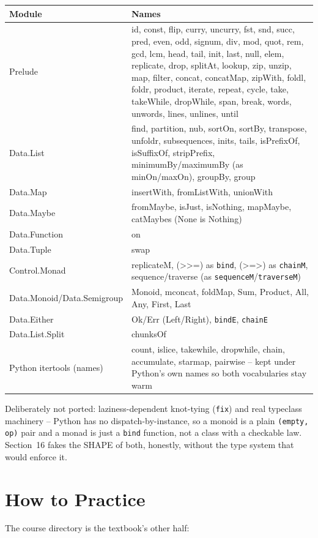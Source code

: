 \documentclass[11pt,letterpaper]{book}
\begin{document}
\begin{center}\small
\begin{tabular}{@{}p{}p{}@{}}
\toprule
\textbf{Module} & \textbf{Names} \\
\midrule
Prelude &
id, const, flip, curry, uncurry, fst, snd, succ, pred, even, odd, signum,
div, mod, quot, rem, gcd, lcm, head, tail, init, last, null, elem,
replicate, drop, splitAt, lookup, zip, unzip, map, filter,
concat, concatMap, zipWith, foldl, foldr, product, iterate, repeat,
cycle, take, takeWhile, dropWhile, span, break, words, unwords, lines,
unlines, until \\
Data.List &
find, partition, nub, sortOn, sortBy, transpose, unfoldr, subsequences,
inits, tails, isPrefixOf, isSuffixOf, stripPrefix, minimumBy/maximumBy
(as minOn/maxOn), groupBy, group \\
Data.Map &
insertWith, fromListWith, unionWith \\
Data.Maybe &
fromMaybe, isJust, isNothing, mapMaybe, catMaybes (None is Nothing) \\
Data.Function & on \\
Data.Tuple & swap \\
Control.Monad & replicateM, (>>=) as \texttt{bind}, (>=>) as \texttt{chainM},
sequence/traverse (as \texttt{sequenceM}/\texttt{traverseM}) \\
Data.Monoid/Data.Semigroup &
Monoid, mconcat, foldMap, Sum, Product, All, Any, First, Last \\
Data.Either & Ok/Err (Left/Right), \texttt{bindE}, \texttt{chainE} \\
Data.List.Split & chunksOf \\
Python itertools (names) &
count, islice, takewhile, dropwhile, chain, accumulate, starmap, pairwise --
kept under Python's own names so both vocabularies stay warm \\
\bottomrule
\end{tabular}
\end{center}

Deliberately not ported: laziness-dependent knot-tying (\texttt{fix}) and real
typeclass machinery -- Python has no dispatch-by-instance, so a monoid is a
plain \texttt{(empty, op)} pair and a monad is just a \texttt{bind} function,
not a class with a checkable law. Section~16 fakes the SHAPE of both, honestly,
without the type system that would enforce it.
\chapter{How to Practice}
The course directory is the textbook's other half:
\end{document}
